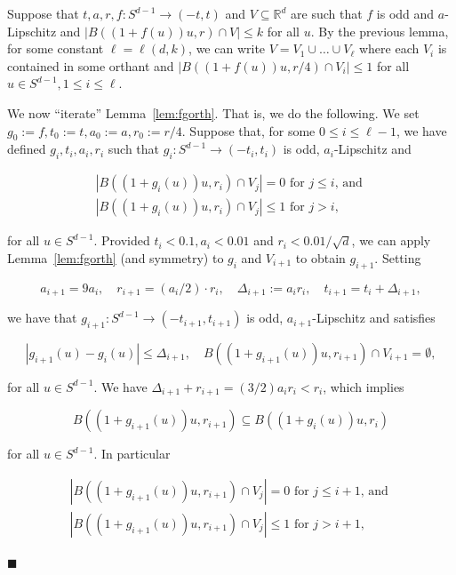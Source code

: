 \documentclass[11pt]{article}%
\newenvironment{proofof}[1]{\vspace{1ex}\noindent{\bf Proof of #1.}}{\hspace*{\fill}$\blacksquare$\vspace{1ex}}
\newcommand{\eR}[0]{\ensuremath{ \mathbb R}}
\begin{document}
\begin{proofof}{Lemma~\ref{lem:fg}}
Suppose that $t,a,r,f : S^{d-1} \to (-t,t)$ and $V \subseteq \eR^d$ are such that
$f$ is odd and $a$-Lipschitz and $|B( (1+f(u)) u, r) \cap V| \leq k$ for all $u$. 
By the previous lemma, for some constant $\ell = \ell(d,k)$, we can write $V = V_1 \cup \dots \cup V_\ell$
where each $V_i$ is contained in some orthant and $|B( (1+f(u)) u, r/4 ) \cap V_i| \leq 1$
for all $u \in S^{d-1}, 1\leq i \leq \ell$.


We now ``iterate'' Lemma~\ref{lem:fgorth}. That is, we do the following.
We set $g_0 := f, t_0 := t, a_0 := a, r_0 := r/4$. 
Suppose that, for some $0 \leq i\leq \ell-1$, we have defined $g_i, t_i, a_i, r_i$ such that 
$g_i : S^{d-1} \to (-t_i,t_i)$ is odd, $a_i$-Lipschitz and 

$$ \begin{array}{l} 
|B( (1+g_i(u)) u, r_i) \cap V_j| = 0 \text{ for $j \leq i$, and } \\[2ex]
|B( (1+g_i(u)) u, r_i) \cap V_j| \leq 1 \text{ for $j > i$, }
\end{array} $$

\noindent
for all $u \in S^{d-1}$.
Provided $t_i < 0.1, a_i < 0.01$ and $r_i < 0.01/\sqrt{d}$, we can 
apply Lemma~\ref{lem:fgorth} (and symmetry) to $g_i$ and $V_{i+1}$ to obtain $g_{i+1}$.
Setting 

$$ a_{i+1} = 9a_i, \quad r_{i+1} = (a_i/2)\cdot r_i, 
\quad \Delta_{i+1} := a_ir_i, \quad t_{i+1} = t_i + \Delta_{i+1}, $$

\noindent
we have that $g_{i+1} : S^{d-1} \to (-t_{i+1},t_{i+1})$ is odd, $a_{i+1}$-Lipschitz and 
satisfies 

$$ |g_{i+1}(u)-g_{i}(u)| \leq \Delta_{i+1}, \quad B( (1+g_{i+1}(u)) u, r_{i+1}) \cap V_{i+1} = \emptyset, $$ 

\noindent
for all $u \in S^{d-1}$.
We have $\Delta_{i+1}+r_{i+1} = (3/2)a_ir_i < r_i$, which implies

\begin{equation}\label{eq:Bsubs} 
B( (1+g_{i+1}(u)) u, r_{i+1}) \subseteq B( (1+g_i(u)) u, r_i)
\end{equation}

\noindent 
for all $u \in S^{d-1}$. In particular

$$ \begin{array}{l} 
|B( (1+g_{i+1}(u)) u, r_{i+1}) \cap V_j| = 0 \text{ for $j \leq i+1$, and } \\[2ex]
|B( (1+g_{i+1}(u)) u, r_{i+1}) \cap V_j| \leq 1 \text{ for $j > i+1$, }
\end{array} $$
% 



\end{proofof}
\end{document}
